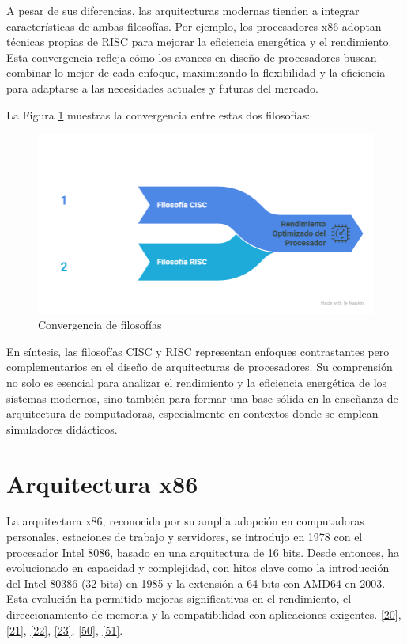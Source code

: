 \documentclass[12pt,oneside]{templates/unerthesis}
\begin{document}
A pesar de sus diferencias, las arquitecturas modernas tienden a integrar características de ambas filosofías. Por ejemplo, los procesadores x86 adoptan técnicas propias de RISC para mejorar la eficiencia energética y el rendimiento. Esta convergencia refleja cómo los avances en diseño de procesadores buscan combinar lo mejor de cada enfoque, maximizando la flexibilidad y la eficiencia para adaptarse a las necesidades actuales y futuras del mercado.

La Figura \ref{fig:convergen} muestras la convergencia entre estas dos filosofías:

\begin{figure}

{\centering \includegraphics[width=1\linewidth]{images/convergen} 

}

\caption{Convergencia de filosofías}\label{fig:convergen}
\end{figure}

En síntesis, las filosofías CISC y RISC representan enfoques contrastantes pero complementarios en el diseño de arquitecturas de procesadores. Su comprensión no solo es esencial para analizar el rendimiento y la eficiencia energética de los sistemas modernos, sino también para formar una base sólida en la enseñanza de arquitectura de computadoras, especialmente en contextos donde se emplean simuladores didácticos.

\hypertarget{arquitectura-x86-1}{%
\section{Arquitectura x86}\label{arquitectura-x86-1}}

La arquitectura x86, reconocida por su amplia adopción en computadoras personales, estaciones de trabajo y servidores, se introdujo en 1978 con el procesador Intel 8086, basado en una arquitectura de 16 bits. Desde entonces, ha evolucionado en capacidad y complejidad, con hitos clave como la introducción del Intel 80386 (32 bits) en 1985 y la extensión a 64 bits con AMD64 en 2003. Esta evolución ha permitido mejoras significativas en el rendimiento, el direccionamiento de memoria y la compatibilidad con aplicaciones exigentes. \protect\hyperlink{ref-stallings_computer_2021}{{[}20{]}}, \protect\hyperlink{ref-intel_64_2025}{{[}21{]}}, \protect\hyperlink{ref-amd_developer_2024}{{[}22{]}}, \protect\hyperlink{ref-abel_ibm_2000}{{[}23{]}}, \protect\hyperlink{ref-brey_intel_microprocessors}{{[}50{]}}, \protect\hyperlink{ref-intel8086manual}{{[}51{]}}.
\end{document}
